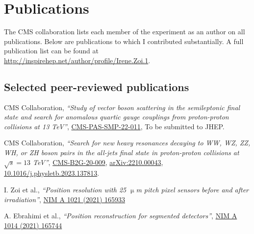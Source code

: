 \ifacademic
  \section{Publications}
The CMS collaboration lists each member of the experiment as an author on all publications. Below are publications to which I contributed substantially. A full publication list can be found at \\ \href{http://inspirehep.net/author/profile/Irene.Zoi.1}{http://inspirehep.net/author/profile/Irene.Zoi.1}.  

\subsection{Selected peer-reviewed publications}
    \begin{refsection}
      \vspace{2mm}
      \onehalfspacing
CMS Collaboration, {\sl ``Study of vector boson scattering in the semileptonic final state and search for anomalous quartic gauge couplings from proton-proton collisions at 13 TeV''},
\href{https://cds.cern.ch/record/2926224/files/SMP-22-011-pas.pdf}{CMS-PAS-SMP-22-011},
To be submitted to JHEP.
    \end{refsection}
  


    \begin{refsection}
      \vspace{2mm}
      \onehalfspacing
CMS Collaboration, {\sl ``Search for new heavy resonances decaying to WW, WZ, ZZ, WH, or ZH boson pairs in the all-jets final state in proton-proton collisions at $\sqrt{s}=13$ TeV''},
\href{https://cds.cern.ch/record/2835154?ln=en}{CMS-B2G-20-009},
\href{https://arxiv.org/abs/2210.00043}{arXiv:2210.00043},
\href{http://dx.doi.org/10.1016/j.physletb.2023.137813}{10.1016/j.physletb.2023.137813}.
    \end{refsection}
    
    
     \begin{refsection}
      \vspace{2mm}
      \onehalfspacing
I. Zoi et al., {\sl ``Position resolution with 25 $\upmu$m pitch pixel sensors before and after irradiation''},  \href{https://www.sciencedirect.com/science/article/pii/S0168900221008962}{NIM A 1021 (2021) 165933}

    \end{refsection}

    \begin{refsection}
      \vspace{2mm}
      \onehalfspacing
A. Ebrahimi et al., {\sl ``Position reconstruction for segmented detectors''},  \href{https://www.sciencedirect.com/science/article/pii/S0168900221007294?via\%3Dihub}{NIM A 1014 (2021) 165744}

    \end{refsection}
    
